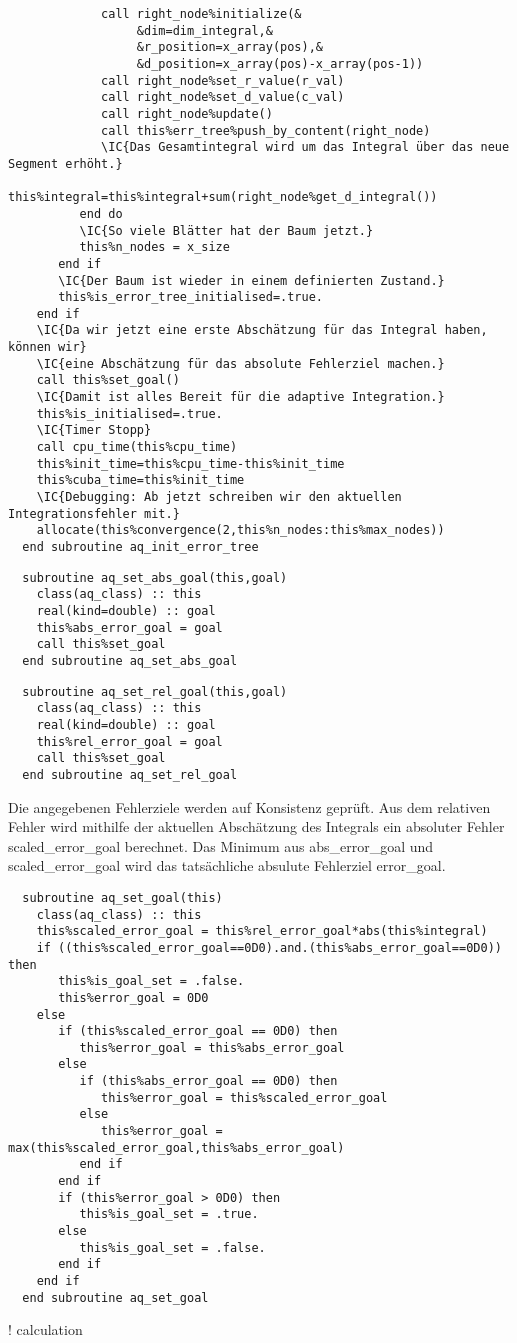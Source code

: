 \begin{Verbatim}
             call right_node%initialize(&
                  &dim=dim_integral,&
                  &r_position=x_array(pos),&
                  &d_position=x_array(pos)-x_array(pos-1))
             call right_node%set_r_value(r_val)
             call right_node%set_d_value(c_val)
             call right_node%update()
             call this%err_tree%push_by_content(right_node)
             \IC{Das Gesamtintegral wird um das Integral über das neue Segment erhöht.}
             this%integral=this%integral+sum(right_node%get_d_integral())
          end do
          \IC{So viele Blätter hat der Baum jetzt.}
          this%n_nodes = x_size
       end if
       \IC{Der Baum ist wieder in einem definierten Zustand.}
       this%is_error_tree_initialised=.true.
    end if
    \IC{Da wir jetzt eine erste Abschätzung für das Integral haben, können wir}
    \IC{eine Abschätzung für das absolute Fehlerziel machen.}
    call this%set_goal()
    \IC{Damit ist alles Bereit für die adaptive Integration.}
    this%is_initialised=.true.
    \IC{Timer Stopp}
    call cpu_time(this%cpu_time)
    this%init_time=this%cpu_time-this%init_time
    this%cuba_time=this%init_time
    \IC{Debugging: Ab jetzt schreiben wir den aktuellen Integrationsfehler mit.}
    allocate(this%convergence(2,this%n_nodes:this%max_nodes))
  end subroutine aq_init_error_tree
\end{Verbatim}
\begin{Verbatim}
  subroutine aq_set_abs_goal(this,goal)
    class(aq_class) :: this
    real(kind=double) :: goal
    this%abs_error_goal = goal
    call this%set_goal
  end subroutine aq_set_abs_goal
\end{Verbatim}
\begin{Verbatim}
  subroutine aq_set_rel_goal(this,goal)
    class(aq_class) :: this
    real(kind=double) :: goal
    this%rel_error_goal = goal
    call this%set_goal
  end subroutine aq_set_rel_goal
\end{Verbatim}
Die angegebenen Fehlerziele werden auf Konsistenz geprüft. Aus dem relativen Fehler wird mithilfe der aktuellen Abschätzung des Integrals ein absoluter Fehler scaled\_error\_goal berechnet. Das Minimum aus abs\_error\_goal und scaled\_error\_goal wird das tatsächliche absulute Fehlerziel error\_goal.
\begin{Verbatim}
  subroutine aq_set_goal(this)
    class(aq_class) :: this
    this%scaled_error_goal = this%rel_error_goal*abs(this%integral)
    if ((this%scaled_error_goal==0D0).and.(this%abs_error_goal==0D0)) then
       this%is_goal_set = .false.
       this%error_goal = 0D0
    else
       if (this%scaled_error_goal == 0D0) then
          this%error_goal = this%abs_error_goal
       else
          if (this%abs_error_goal == 0D0) then
             this%error_goal = this%scaled_error_goal
          else
             this%error_goal = max(this%scaled_error_goal,this%abs_error_goal)
          end if
       end if
       if (this%error_goal > 0D0) then
          this%is_goal_set = .true.
       else
          this%is_goal_set = .false.
       end if
    end if
  end subroutine aq_set_goal
\end{Verbatim}
! calculation

